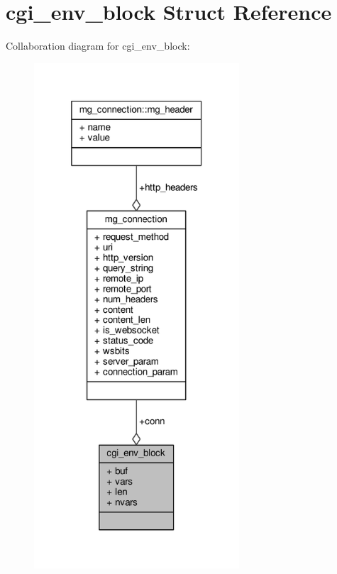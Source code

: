 \hypertarget{structcgi__env__block}{}\section{cgi\+\_\+env\+\_\+block Struct Reference}
\label{structcgi__env__block}


Collaboration diagram for cgi\+\_\+env\+\_\+block\+:
\nopagebreak
\begin{figure}[H]
\begin{center}
\leavevmode
\includegraphics[width=217pt]{dd/d5c/structcgi__env__block__coll__graph}
\end{center}
\end{figure}

